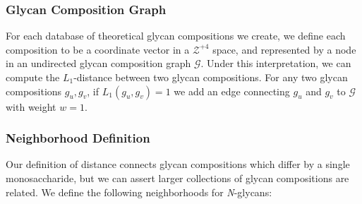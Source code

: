     \subsubsection{Glycan Composition Graph}
        For each database of theoretical glycan compositions we create, we
        define each composition to be a coordinate vector in a $\mathcal{Z}^{+4}$
        space, and represented by a node in an undirected glycan composition
        graph $\mathcal{G}$. Under this interpretation, we can compute the
        $L_1$-distance between two glycan compositions. For any two glycan
        compositions $g_u, g_v$, if $L_1(g_u, g_v) = 1$ we add an edge
        connecting $g_u$ and $g_v$ to $\mathcal{G}$ with weight $w = 1$.

    \subsubsection{Neighborhood Definition}
        Our definition of distance connects glycan compositions which differ
        by a single monosaccharide, but we can assert larger collections of
        glycan compositions are related. We define the following neighborhoods
        for {\em N}-glycans:

